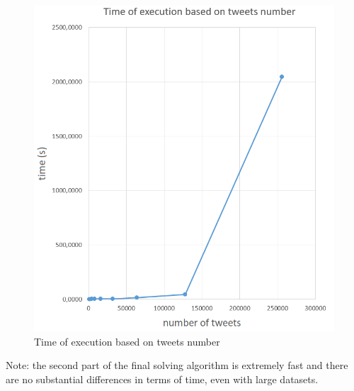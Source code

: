\begin{figure}[h]
  \includegraphics[scale=0.415]{scalability.png}
  \centering
  \caption{Time of execution based on tweets number}
  \label{fig_times}
\end{figure}

Note: the second part of the final solving algorithm is extremely fast and there are no substantial differences in terms of time, even with large datasets.

